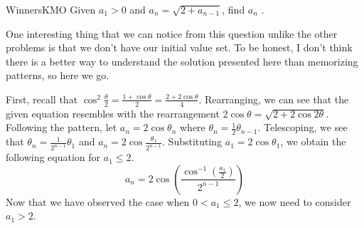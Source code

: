 \documentclass[../../../main.tex]{subfiles}
\begin{document}
\begin{problem}{WinnersKMO}{}
Given $a_1 > 0$ and $a_n = \sqrt{2 + a_{n-1}}$, find $a_n$
\cite{MATH01-5}.
\end{problem}
\begin{solution}
One interesting thing that we can notice from this question unlike the
other problems is that we don't have our initial value set.
To be honest, I don't think there is a better way to understand the
solution presented here than memorizing patterns, so here we go.

First, recall that $\cos^2 \frac{\theta}{2} = \frac{1 + \cos\theta}{2}
= \frac{2 + 2\cos\theta}{4}$. Rearranging, we can see that the given
equation resembles with the rearrangement $2\cos\theta =
\sqrt{2 + 2\cos2\theta}$. Following the pattern, let
$a_n = 2\cos\theta_n$ where $\theta_n = \frac{1}{2} \theta_{n-1}$.
Telescoping, we see that $\theta_n = \frac{1}{2^{n-1}} \theta_1$
and $a_n = 2 \cos\frac{\theta_1}{2^{n-1}}$. Substituting $a_1 =
2\cos\theta_1$, we obtain the following equation for $a_1 \leq 2$.
\[
a_n = 2\cos\left(
    \frac{ \cos^{-1} \left( \frac{a_1}{2} \right) }{2^{n-1}}
\right)
\]
Now that we have observed the case when $0 < a_1 \leq 2$, we now need
to consider $a_1 > 2$.


\end{solution}
\end{document}
